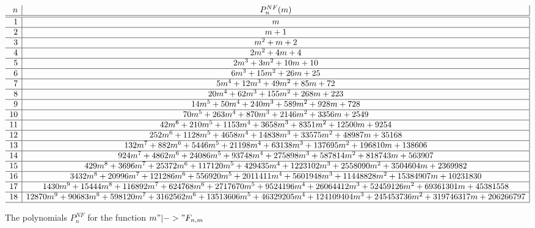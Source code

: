 \documentclass[preprint,authoryear]{elsarticle}
\begin{document}
\begin{landscape}
  \begin{figure}[h]
    \centering
   \begin{math}
    \begin{array}[h]{ r | c | }
      n & P_n^{NF}(m)\\
      \hline\hline
      1 & m \\
      \hline
      2 & m +1 \\
      \hline
      3 & m ^2 + m +2 \\
      \hline
4 & 2 m^{2}+4 m+4\\
\hline
5 & 2 m^{3}+3 m^{2}+10 m+10 \\
\hline
6 & 6 m^{3}+15 m^{2}+26 m+25\\
\hline
7 & 5 m^{4}+12 m^{3}+49 m^{2}+85 m+72\\
\hline
8 & 20 m^{4}+62 m^{3}+155 m^{2}+268 m+223\\
\hline
9 & 14 m^{5}+50 m^{4}+240 m^{3}+589 m^{2}+928 m+728\\
\hline
10 & 70 m^{5}+263 m^{4}+870 m^{3}+2146 m^{2}+3356 m+2549\\
\hline
11 & 42 m^{6}+210 m^{5}+1153 m^{4}+3658 m^{3}+8351 m^{2}+12500
m+9254\\
\hline
12 & 252 m^{6}+1128 m^{5}+4658 m^{4}+14838 m^{3}+33575 m^{2}+48987
m+35168 \\
\hline
13 & 132 m^{7}+882 m^{6}+5446 m^{5}+21198 m^{4}+63138 m^{3}+137695
m^{2}+196810 m+138606 \\
\hline
   14 & 924 m^{7}+4862 m^{6}+24086 m^{5}+93748 m^{4}+275898 m^{3}+587814
m^{2}+818743 m+563907\\
\hline
15 & 429 m^{8}+3696 m^{7}+25372 m^{6}+117120 m^{5}+429435
m^{4}+1223102 m^{3}+2558090 m^{2}+3504604 m+2369982\\
\hline
16 & 3432 m^{8}+20996 m^{7}+121286 m^{6}+556920 m^{5}+2011411 m^{4}+5601948 m^{3}+11448828 m^{2}+15384907 m+10231830\\
\hline
17 & 1430 m^{9}+15444 m^{8}+116892 m^{7}+624768 m^{6}+2717670
m^{5}+9524196 m^{4}+26064412 m^{3}+52459126 m^{2}+69361301
m+45381558\\
\hline
18 & 12870 m^{9}+90683 m^{8}+598120 m^{7}+3162562 m^{6}+13513606
m^{5}+46329205 m^{4}+124109404 m^{3}+245453736 m^{2}+319746317
m+206266797\\
\hline
    \end{array}
  \end{math}
    \caption{The polynomials $P^{NF}_n$ for the function $m"|->" F_{n,m}$}\label{fig:PFn}
    \label{fig:polyF}
  \end{figure}
\end{landscape}
\end{document}
